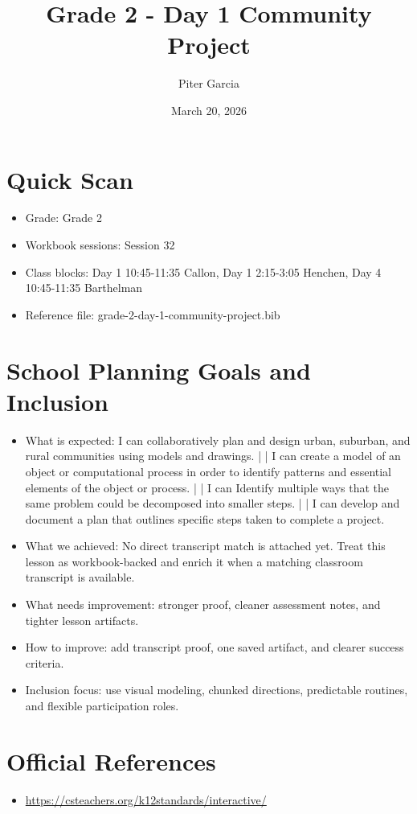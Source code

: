 \documentclass[11pt]{article}
\title{Grade 2 - Day 1 Community Project}
\author{Piter Garcia}
\date{March 20, 2026}
\begin{document}
\maketitle
\section*{Quick Scan}
\begin{itemize}[leftmargin=*]
\item Grade: Grade 2
\item Workbook sessions: Session 32
\item Class blocks: Day 1 10:45-11:35 Callon, Day 1 2:15-3:05 Henchen, Day 4 10:45-11:35 Barthelman
\item Reference file: grade-2-day-1-community-project.bib
\end{itemize}
\section*{School Planning Goals and Inclusion}
\begin{itemize}[leftmargin=*]
\item What is expected: I can collaboratively plan and design urban, suburban, and rural communities using models and drawings. | | I can create a model of an object or computational process in order to identify patterns and essential elements of the object or process. | | I can Identify multiple ways that the same problem could be decomposed into smaller steps. | | I can develop and document a plan that outlines specific steps taken to complete a project.
\item What we achieved: No direct transcript match is attached yet. Treat this lesson as workbook-backed and enrich it when a matching classroom transcript is available.
\item What needs improvement: stronger proof, cleaner assessment notes, and tighter lesson artifacts.
\item How to improve: add transcript proof, one saved artifact, and clearer success criteria.
\item Inclusion focus: use visual modeling, chunked directions, predictable routines, and flexible participation roles.
\end{itemize}
\section*{Official References}
\begin{itemize}[leftmargin=*]
\item \url{https://csteachers.org/k12standards/interactive/}

\end{itemize}
\end{document}
